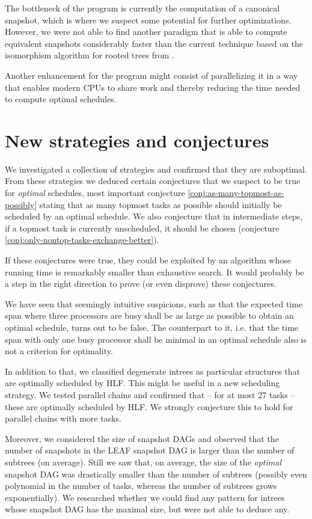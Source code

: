 The bottleneck of the program is currently the computation of a canonical snapshot, which is where we suspect some potential for further optimizations. However, we were not able to find another paradigm that is able to compute equivalent snapshots considerably faster than the current technique based on the isomorphism algorithm for rooted trees from \cite{aho1974design}.

Another enhancement for the program might consist of parallelizing it in a way that enables modern CPUs to share work and thereby reducing the time needed to compute optimal schedules.

\section{New strategies and conjectures}
\label{sec:conclusion-strategies}

We investigated a collection of strategies and confirmed that they are suboptimal. From these strategies we deduced certain conjectures that we suspect to be true for \emph{optimal} schedules, most important conjecture \ref{conj:as-many-topmost-as-possibly} stating that as many topmost tasks as possible should initially be scheduled by an optimal schedule. We also conjecture that in intermediate steps, if a topmost task is currently unscheduled, it should be chosen (conjecture \ref{conj:only-nontop-tasks-exchange-better}).

If these conjectures were true, they could be exploited by an algorithm whose running time is remarkably smaller than exhaustive search. It would probably be a step in the right direction to prove (or even disprove) these conjectures. 

We have seen that seemingly intuitive suspicions, such as that the expected time span where three processors are busy shall be as large as possible to obtain an optimal schedule, turns out to be false. The counterpart to it, i.e. that the time span with only one busy processor shall be minimal in an optimal schedule also is not a criterion for optimality.

In addition to that, we classified degenerate intrees as particular structures that are optimally scheduled by HLF. This might be useful in a new scheduling strategy. We tested parallel chains and confirmed that -- for at most 27 tasks -- these are optimally scheduled by HLF. We strongly conjecture this to hold for parallel chains with more tasks.

Moreover, we considered the size of snapshot DAGs and observed that the number of snapshots in the LEAF snapshot DAG is larger than the number of subtrees (on average). Still we saw that, on average, the size of the \emph{optimal} snapshot DAG was drastically smaller than the number of subtrees (possibly even polynomial in the number of tasks, whereas the number of subtrees grows exponentially). We researched whether we could find any pattern for intrees whose snapshot DAG has the maximal size, but were not able to deduce any.

